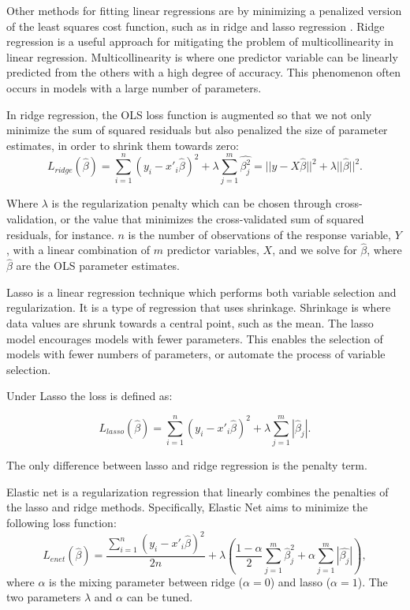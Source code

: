 \documentclass[final,3p,times,twocolumn,numbers]{elsarticle}
\begin{document}
Other methods for fitting linear regressions are by minimizing a penalized version of the least squares cost function, such as in ridge and lasso regression \cite{Tibshirani1996a, GeladiPaul1994Mrac}. Ridge regression is a useful approach for mitigating the problem of multicollinearity in linear regression. Multicollinearity is where one predictor variable can be linearly predicted from the others with a high degree of accuracy. This phenomenon often occurs in models with a large number of parameters. 

In ridge regression, the OLS loss function is augmented so that we not only minimize the sum of squared residuals but also penalized the size of parameter estimates, in order to shrink them towards zero:
\begin{equation}
    L_{ridge}(\hat{\beta})=\sum^n_{i=1}(y_i-x'_i\hat{\beta})^2+\lambda\sum^m_{j=1}\hat{\beta^2_j}=||y-X\hat{\beta}||^2+\lambda||\hat{\beta}||^2.
\end{equation}

Where $\lambda$ is the regularization penalty which can be chosen through cross-validation, or the value that minimizes the cross-validated sum of squared residuals, for instance. $n$ is the number of observations of the response variable, $Y$, with a linear combination of $m$ predictor variables, $X$, and we solve for $\hat{\beta}$, where $\hat{\beta}$ are the OLS parameter estimates.



Lasso is a linear regression technique which performs both variable selection and regularization. It is a type of regression that uses shrinkage. Shrinkage is where data values are shrunk towards a central point, such as the mean. The lasso model encourages models with fewer parameters. This enables the selection of models with fewer numbers of parameters, or automate the process of variable selection.

Under Lasso the loss is defined as:

\begin{equation}
    L_{lasso}(\hat{\beta})=\sum^n_{i=1}(y_i-x'_i\hat{\beta})^2+\lambda\sum^m_{j=1}|\hat{\beta}_j|.
\end{equation}

The only difference between lasso and ridge regression is the penalty term.

Elastic net is a regularization regression that linearly combines the penalties of the lasso and ridge methods. Specifically, Elastic Net aims to minimize the following loss function:
\begin{equation}
L_{enet}(\hat{\beta})=\frac{\sum^n_{i=1}(y_i-x'_i\hat{\beta})^2}{2n}+\lambda(\frac{1-\alpha}{2}\sum^m_{j=1}\hat{\beta}^2_j+\alpha\sum^m_{j=1}|\hat{\beta_j}|),
\end{equation}
where $\alpha$ is the mixing parameter between ridge ($\alpha=0$) and lasso ($\alpha=1$). The two parameters $\lambda$ and $\alpha$ can be tuned.
\end{document}
